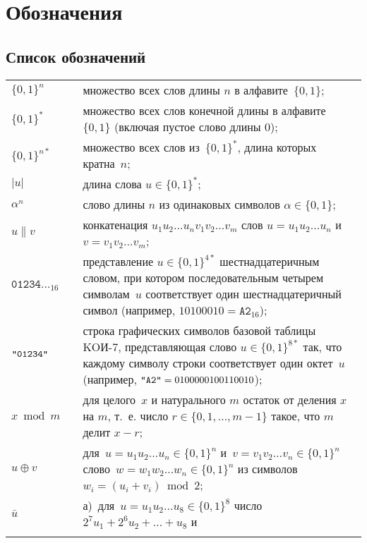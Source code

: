 \chapter{Обозначения}\label{DEFS}

\section{Список обозначений}

{\tabcolsep 0pt
\begin{longtable}{lrp{13.5cm}}
$\{0,1\}^n$  & \hspace{2mm} &
множество всех слов длины $n$ в алфавите~$\{0,1\}$;
\\[4pt]
$\{0,1\}^*$  &&
множество всех слов конечной длины в алфавите~$\{0,1\}$
(включая пустое слово длины $0$);
\\[4pt]
%
$\{0,1\}^{n*}$  &&
множество всех слов из~$\{0,1\}^*$,
длина которых кратна~$n$;
\\[4pt]
%
$|u|$      &&
длина слова $u\in\{0,1\}^*$;
\\[4pt]
%
$\alpha^n$  &&
слово длины $n$ из одинаковых символов $\alpha\in\{0,1\}$;
\\[4pt]
%
$u\parallel v$  &&
конкатенация
$u_1 u_2\ldots u_n v_1 v_2\ldots v_m$
слов
$u=u_1 u_2\ldots u_n$ и
$v=v_1 v_2\ldots v_m$;
\\[4pt]
%
$\texttt{01234\ldots}_{16}$ && 
представление $u\in\{0,1\}^{4*}$ шестнадцатеричным словом,
при котором последовательным четырем символам~$u$ соответствует
один шестнадцатеричный символ
(например, $10100010=\texttt{A2}_{16}$);
\\[4pt]
%
$\texttt{\textquotedbl 01234\textquotedbl}$ && 
строка графических символов базовой таблицы KOИ-7, 
представляющая слово $u\in\{0,1\}^{8*}$ так,
что каждому символу строки соответствует один октет~$u$
(например, $\texttt{\textquotedbl A2\textquotedbl}=0100000100110010$);
\\[4pt]
%
$x\bmod m$             &&
для целого~$x$ и натурального $m$ остаток от деления $x$ на $m$,
т.~е. число $r\in\{0,1,\ldots,m-1\}$ такое, что $m$ делит $x-r$;
\\[4pt]
%
$u\oplus v$             &&
для~$u=u_1 u_2\ldots u_n\in\{0,1\}^n$ 
и~$v=v_1 v_2\ldots v_n\in\{0,1\}^n$
слово~$w=w_1 w_2\ldots w_n\in\{0,1\}^n$
из символов~$w_i=(u_i+v_i)\bmod{2}$;
\\[4pt]
%
$\bar u$                &&
а)~для~$u=u_1 u_2\ldots u_8\in\{0,1\}^8$
число $2^7 u_1+2^6 u_2+\ldots+u_8$ и\\[2pt]
%
                        &&

\end{longtable}}
